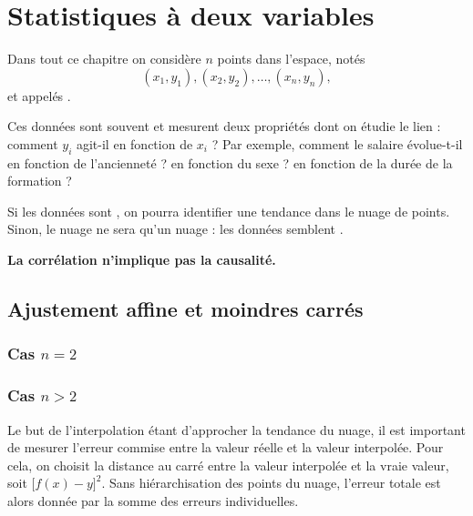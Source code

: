 
\chapter{Statistiques à deux variables}

Dans tout ce chapitre on considère $n$ points dans l'espace, notés 
	\[ (x_1, y_1), (x_2, y_2), \dots, (x_n, y_n), \]
et appelés .

Ces données sont souvent  et mesurent deux propriétés dont on étudie le lien : comment $y_i$ agit-il en fonction de $x_i$ ?
Par exemple, comment le salaire évolue-t-il en fonction de l'ancienneté ? en fonction du sexe ? en fonction de la durée de la formation ?

Si les données sont , on pourra identifier une tendance dans le nuage de points.
Sinon, le nuage ne sera qu'un nuage : les données semblent .

\textbf{\warning La corrélation n'implique pas la causalité.}

\section{Ajustement affine et moindres carrés}


\subsection{Cas $n=2$}


\subsection{Cas $n>2$}


Le but de l'interpolation étant d'approcher la tendance du nuage, il est important de mesurer l'erreur commise entre la valeur réelle et la valeur interpolée.
Pour cela, on choisit la distance au carré entre la valeur interpolée et la vraie valeur, soit $\bigl[ f(x) - y \bigr]^2$.
Sans hiérarchisation des points du nuage, l'erreur totale est alors donnée par la somme des erreurs individuelles.

